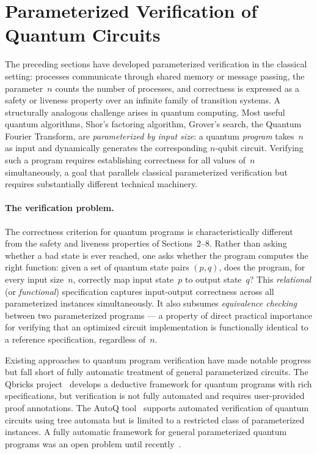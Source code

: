 \section{Parameterized Verification of Quantum Circuits}

The preceding sections have developed parameterized verification in the
classical setting: processes communicate through shared memory or message
passing, the parameter~$n$ counts the number of processes, and correctness
is expressed as a safety or liveness property over an infinite family of
transition systems. A structurally analogous challenge arises in quantum
computing. Most useful quantum algorithms, Shor's factoring algorithm,
Grover's search, the Quantum Fourier Transform, are \emph{parameterized by
input size}: a quantum \emph{program} takes~$n$ as input and dynamically
generates the corresponding $n$-qubit circuit. Verifying such a program
requires establishing correctness for all values of~$n$ simultaneously, a
goal that parallels classical parameterized verification but requires
substantially different technical machinery.

\paragraph{The verification problem.}
The correctness criterion for quantum programs is characteristically different
from the safety and liveness properties of Sections~2--8. Rather than asking
whether a bad state is ever reached, one asks whether the program computes
the right function: given a set of quantum state pairs $(p, q)$, does the
program, for every input size~$n$, correctly map input state~$p$ to output
state~$q$? This \emph{relational} (or \emph{functional}) specification captures
input-output correctness across all parameterized instances simultaneously.
It also subsumes \emph{equivalence checking} between two parameterized programs
--- a property of direct practical importance for verifying that an optimized
circuit implementation is functionally identical to a reference specification,
regardless of~$n$.

Existing approaches to quantum program verification have made notable progress
but fall short of fully automatic treatment of general parameterized circuits.
The Qbricks project~\cite{Qbricks} develops a deductive framework for quantum
programs with rich specifications, but verification is not fully automated and
requires user-provided proof annotations. The AutoQ
tool~\cite{AutoQ1,AutoQ2} supports automated verification of quantum circuits
using tree automata but is limited to a restricted class of parameterized
instances. A fully automatic framework for general parameterized quantum
programs was an open problem until recently~\cite{AutoQPara}.

